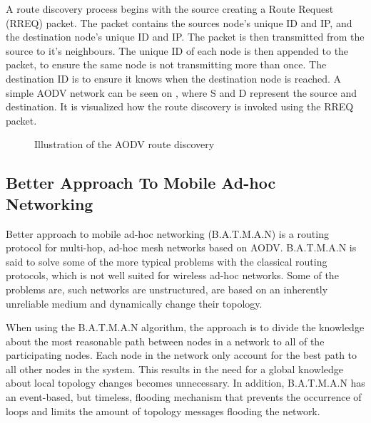 A route discovery process begins with the source creating a Route Request (RREQ) packet.
The packet contains the sources node's unique ID and IP, and the destination node's unique ID and IP.
The packet is then transmitted from the source to it's neighbours.
The unique ID of each node is then appended to the packet, to ensure the same node is not transmitting more than once.
The destination ID is to ensure it knows when the destination node is reached.
A simple AODV network can be seen on , where S and D represent the source and destination. It is visualized how the route discovery is invoked using the RREQ packet.\cite{AOVD2}

\begin{figure}[!h]
	\centering
	\caption{Illustration of the AODV route discovery}
	\label{fig:AODVfigure}
\end{figure}

\subsection{Better Approach To Mobile Ad-hoc Networking}
Better approach to mobile ad-hoc networking (B.A.T.M.A.N) is a routing protocol for multi-hop, ad-hoc mesh networks based on AODV. 
B.A.T.M.A.N is said to solve some of the more typical problems with the classical routing protocols, which is not well suited for wireless ad-hoc networks.
Some of the problems are, such networks are unstructured, are based on an inherently unreliable medium and dynamically change their topology.

When using the B.A.T.M.A.N algorithm, the approach is to divide the knowledge about the most reasonable path between nodes in a network to all of the participating nodes.
Each node in the network only account for the best path to all other nodes in the system.
This results in the need for a global knowledge about local topology changes becomes unnecessary.
In addition, B.A.T.M.A.N has an event-based, but timeless, flooding mechanism that prevents the occurrence of loops and limits the amount of topology messages flooding the network.

